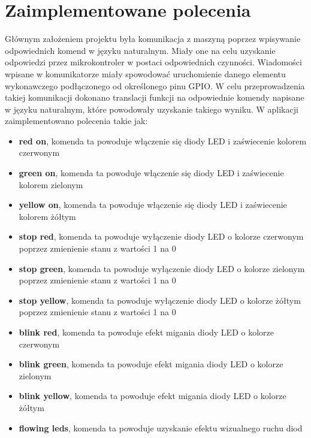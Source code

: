 \section{Zaimplementowane polecenia}
Głównym założeniem projektu była komunikacja z maszyną poprzez wpisywanie odpowiednich komend w języku naturalnym. Miały one na celu uzyskanie odpowiedzi przez mikrokontroler w postaci odpowiednich czynności. Wiadomości wpisane w komunikatorze miały spowodować uruchomienie danego elementu wykonawczego podłączonego od określonego pinu GPIO. W celu przeprowadzenia takiej komunikacji dokonano translacji funkcji na odpowiednie komendy napisane w języku naturalnym, które powodowały uzyskanie takiego wyniku. W aplikacji zaimplementowano polecenia takie jak:
\begin{itemize}  
	\item \textbf{red on}, komenda ta powoduje włączenie się diody LED i zaświecenie kolorem czerwonym
	\\
	\item \textbf{green on}, komenda ta powoduje włączenie się diody LED i zaświecenie kolorem zielonym
	\\
\item \textbf{yellow on}, komenda ta powoduje włączenie się diody LED i zaświecenie kolorem żółtym
	\\
\item \textbf{stop red}, komenda ta powoduje wyłączenie diody LED o kolorze czerwonym poprzez zmienienie stanu z wartości 1 na 0
	\\
	\item \textbf{stop green}, komenda ta powoduje wyłączenie diody LED o kolorze zielonym poprzez zmienienie stanu z wartości 1 na 0
	\\
\item \textbf{stop yellow}, komenda ta powoduje wyłączenie diody LED o kolorze żółtym poprzez zmienienie stanu z wartości 1 na 0
	\\
	\item \textbf{blink red}, komenda ta powoduje efekt migania diody LED o kolorze czerwonym
	\\
\item \textbf{blink green}, komenda ta powoduje efekt migania diody LED o kolorze zielonym
	\\
	\item \textbf{blink yellow}, komenda ta powoduje efekt migania diody LED o kolorze żółtym
	\\
\item \textbf{flowing leds}, komenda ta powoduje uzyskanie efektu wizualnego ruchu diod

\end{itemize}
